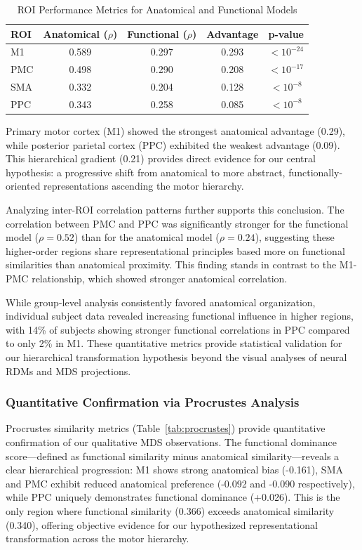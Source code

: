 \documentclass{article}
\begin{document}
\begin{table}[h]
\centering
\caption{ROI Performance Metrics for Anatomical and Functional Models}
\label{tab:roi_metrics}
\begin{tabular}{|l|c|c|c|c|}
\hline
\textbf{ROI} & \textbf{Anatomical ($\rho$)} & \textbf{Functional ($\rho$)} & \textbf{Advantage} & \textbf{p-value} \\
\hline
M1 & 0.589 & 0.297 & 0.293 & $< 10^{-24}$ \\
PMC & 0.498 & 0.290 & 0.208 & $< 10^{-17}$ \\
SMA & 0.332 & 0.204 & 0.128 & $< 10^{-8}$ \\
PPC & 0.343 & 0.258 & 0.085 & $< 10^{-8}$ \\
\hline
\end{tabular}
\end{table}

Primary motor cortex (M1) showed the strongest anatomical advantage (0.29), while posterior parietal cortex (PPC) exhibited the weakest advantage (0.09). This hierarchical gradient (0.21) provides direct evidence for our central hypothesis: a progressive shift from anatomical to more abstract, functionally-oriented representations ascending the motor hierarchy.

Analyzing inter-ROI correlation patterns further supports this conclusion. The correlation between PMC and PPC was significantly stronger for the functional model ($\rho = 0.52$) than for the anatomical model ($\rho = 0.24$), suggesting these higher-order regions share representational principles based more on functional similarities than anatomical proximity. This finding stands in contrast to the M1-PMC relationship, which showed stronger anatomical correlation.

While group-level analysis consistently favored anatomical organization, individual subject data revealed increasing functional influence in higher regions, with 14\% of subjects showing stronger functional correlations in PPC compared to only 2\% in M1. These quantitative metrics provide statistical validation for our hierarchical transformation hypothesis beyond the visual analyses of neural RDMs and MDS projections.


\subsubsection{Quantitative Confirmation via Procrustes Analysis}

Procrustes similarity metrics (Table~\ref{tab:procrustes}) provide quantitative confirmation of our qualitative MDS observations. The functional dominance score—defined as functional similarity minus anatomical similarity—reveals a clear hierarchical progression: M1 shows strong anatomical bias (-0.161), SMA and PMC exhibit reduced anatomical preference (-0.092 and -0.090 respectively), while PPC uniquely demonstrates functional dominance (+0.026). This is the only region where functional similarity (0.366) exceeds anatomical similarity (0.340), offering objective evidence for our hypothesized representational transformation across the motor hierarchy.
\end{document}
